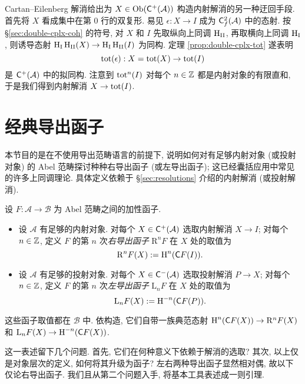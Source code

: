 \begin{remark}\label{rem:double-cplx-resolution}
	Cartan--Eilenberg 解消给出为 $X \in \operatorname{Ob}(\mathsf{C}^+(\mathcal{A}))$ 构造内射解消的另一种迂回手段. 首先将 $X$ 看成集中在第 $0$ 行的双复形. 易见 $\epsilon: X \to I$ 成为 $\mathsf{C}^2_f(\mathcal{A})$ 中的态射. 按 \S\ref{sec:double-cplx-coh} 的符号, 对 $X$ 和 $I$ 先取纵向上同调 $\operatorname{H}_{\mathrm{II}}$, 再取横向上同调 $\operatorname{H}_{\mathrm{I}}$, 则诱导态射 $\operatorname{H}_{\mathrm{I}} \operatorname{H}_{\mathrm{II}} (X) \to \operatorname{H}_{\mathrm{I}} \operatorname{H}_{\mathrm{II}} (I)$ 为同构. 定理 \ref{prop:double-cplx-tot} 遂表明
	\[ \operatorname{tot}(\epsilon): X = \operatorname{tot}(X) \to \operatorname{tot}(I) \]
	是 $\mathsf{C}^+(\mathcal{A})$ 中的拟同构. 注意到 $\operatorname{tot}^n(I)$ 对每个 $n \in \mathbb{Z}$ 都是内射对象的有限直和, 于是我们得到内射解消 $X \to \operatorname{tot}(I)$.
\end{remark}

\section{经典导出函子}\label{sec:derived-primer}
本节目的是在不使用导出范畴语言的前提下, 说明如何对有足够内射对象 (或投射对象) 的 Abel 范畴探讨种种右导出函子 (或左导出函子); 这已经囊括应用中常见的许多上同调理论. 具体定义依赖于 \S\ref{sec:resolutions} 介绍的内射解消 (或投射解消).

\begin{definition}\label{def:derived-primer}
	设 $F: \mathcal{A} \to \mathcal{B}$ 为 Abel 范畴之间的加性函子.
	\begin{itemize}
		\item 设 $\mathcal{A}$ 有足够的内射对象. 对每个 $X \in \mathsf{C}^{+}(\mathcal{A})$ 选取内射解消 $X \to I$; 对每个 $n \in \mathbb{Z}$, 定义 $F$ 的第 $n$ 次\emph{右导出函子} $\mathrm{R}^n F$ 在 $X$ 处的取值为
		\[ \mathrm{R}^n F(X) := \operatorname{H}^n(\mathsf{C}F(I)). \]
		\item 设 $\mathcal{A}$ 有足够的投射对象. 对每个 $X \in \mathsf{C}^{-}(\mathcal{A})$ 选取投射解消 $P \to X$; 对每个 $n \in \mathbb{Z}$, 定义 $F$ 的第 $n$ 次\emph{左导出函子} $\mathrm{L}_n F$ 在 $X$ 处的取值为
		\[ \mathrm{L}_n F(X) := \operatorname{H}^{-n}(\mathsf{C}F(P)). \]
	\end{itemize}
	这些函子取值都在 $\mathcal{B}$ 中. 依构造, 它们自带一族典范态射 $\operatorname{H}^n(\mathsf{C}F(X)) \to \mathrm{R}^n F(X)$ 和 $\mathrm{L}_n F(X) \to \operatorname{H}^{-n}(\mathsf{C}F(X))$.
\end{definition}

这一表述留下几个问题. 首先, 它们在何种意义下依赖于解消的选取? 其次, 以上仅是对象层次的定义, 如何将其升级为函子? 左右两种导出函子显然相对偶, 故以下仅论右导出函子. 我们且从第二个问题入手, 将基本工具表述成一则引理.

